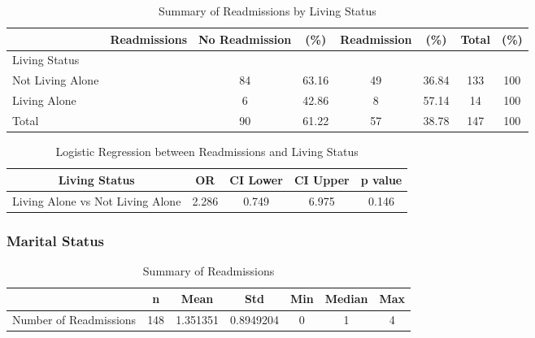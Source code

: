 \documentclass[12pt,]{article}
\begin{document}
\begin{table}[!h]

\caption{\label{tab:unnamed-chunk-6}Summary of Readmissions by Living Status}
\centering
\begin{tabular}{>{\centering\arraybackslash}p{5cm}ccccccc}
\toprule
  & Readmissions & No Readmission & (\%) & Readmission & (\%) & Total & (\%)\\
\midrule
Living Status &  &  &  &  &  &  & \\
\rowcolor[HTML]{E3E5E7}  Not Living Alone &  & 84 & 63.16 & 49 & 36.84 & 133 & 100\\
Living Alone &  & 6 & 42.86 & 8 & 57.14 & 14 & 100\\
\rowcolor[HTML]{E3E5E7}  Total &  & 90 & 61.22 & 57 & 38.78 & 147 & 100\\
\bottomrule
\end{tabular}
\end{table}

\begin{table}[!h]

\caption{\label{tab:unnamed-chunk-6}Logistic Regression between Readmissions and Living Status}
\centering
\begin{tabular}{ccccc}
\toprule
Living Status & OR & CI Lower & CI Upper & p value\\
\midrule
\rowcolor{white}  Living Alone vs Not Living Alone & 2.286 & 0.749 & 6.975 & 0.146\\
\bottomrule
\end{tabular}
\end{table}

\pagebreak

\subsubsection{Marital Status}\label{marital-status}

\begin{table}[!h]

\caption{\label{tab:unnamed-chunk-7}Summary of Readmissions}
\centering
\begin{tabular}{>{\raggedright\arraybackslash}p{5cm}cccccc}
\toprule
  & n & Mean & Std & Min & Median & Max\\
\midrule
\rowcolor{white}  Number of Readmissions & 148 & 1.351351 & 0.8949204 & 0 & 1 & 4\\
\bottomrule
\end{tabular}
\end{table}
\end{document}
